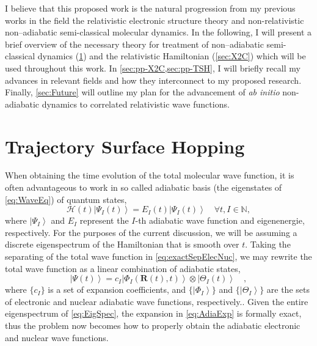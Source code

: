 \documentclass[12pt]{article}
\newcommand{\ket}[1]{\left\vert #1 \right\rangle}         %
\newcommand*\vc[1]{\boldsymbol{#1}}
\newcommand*\op[1]{\mathcal{#1}}
\begin{document}


I believe that this proposed work is the natural progression from my previous
works in the field the relativistic electronic structure
theory\cite{DBWY16_Accepted1} and non-relativistic non--adiabatic semi-classical
molecular dynamics.\cite{DBWY16_JCTC935,DBWY16_Submitted1} In the following, I
will present a brief overview of the necessary theory for treatment of
non--adiabatic semi-classical dynamics (\cref{sec:TSH}) and the relativistic
Hamiltonian (\cref{sec:X2C}) which will be used throughout this work.
In \cref{sec:pp-X2C,sec:pp-TSH}, I will briefly recall my advances in relevant
fields and how they interconnect to my proposed research.  Finally,
\cref{sec:Future} will outline my plan for the advancement of \emph{ab initio}
non-adiabatic dynamics to correlated relativistic wave functions.


\section{Trajectory Surface Hopping}
\label{sec:TSH}

When obtaining the time evolution of the total molecular wave function, it is
often advantageous to work in so called adiabatic basis (the eigenstates of
\cref{eq:WaveEq}) of quantum states,
\begin{equation}
\op{H}(t) \ket{\Psi_I (t)} = E_I(t) \ket{\Psi_I (t)}
\quad \forall t, I \in \mathbb{N},
\label{eq:EigSpec}
\end{equation}
where $\ket{\Psi_I}$ and $E_I$ represent the $I$-th adiabatic wave function and
eigenenergie, respectively. For the purposes of the current discussion, we will
be assuming a discrete eigenspectrum of the Hamiltonian that is smooth over $t$.
Taking the separating of the total wave function in \cref{eq:exactSepElecNuc},
we may rewrite the total wave function as a linear combination of adiabatic
states,
\begin{equation}
\ket{\Psi (t)} = c_I \ket{\Phi_I (\vc{R}(t),t)} \otimes \ket{\Theta_I (t)}
\quad ,
\label{eq:AdiaExp}
\end{equation}
where $\{ c_I \}$ is a set of expansion coefficients, and $\{\ket{\Phi_I}\}$ and
$\{\ket{\Theta_I}\}$ are the sets of electronic and nuclear adiabatic wave
functions, respectively.. Given the entire eigenspectrum of \cref{eq:EigSpec},
the expansion in \cref{eq:AdiaExp} is formally exact, thus the problem now
becomes how to properly obtain the adiabatic electronic and nuclear wave
functions.
\end{document}
